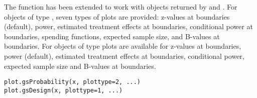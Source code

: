\begin{Description}\relax
The  function has been extended to work with objects returned by  and . 
For objects of type , seven types of plots are provided: z-values at boundaries (default), power, 
estimated treatment effects at boundaries, 
conditional power at boundaries, spending functions, expected sample size, and B-values at boundaries.
For objects of type  plots are available for z-values at boundaries, power (default), estimated treatment effects at boundaries, conditional power, expected sample size and B-values at boundaries.
\end{Description}
\begin{Usage}
\begin{verbatim}
plot.gsProbability(x, plottype=2, ...)
plot.gsDesign(x, plottype=1, ...)
\end{verbatim}
\end{Usage}
